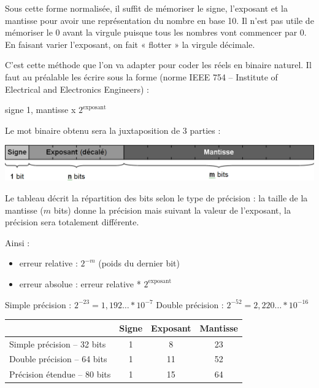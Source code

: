 \documentclass[10pt,fleqn]{article} %
\begin{document}
Sous cette forme normalisée, il suffit de mémoriser le signe, l’exposant et la mantisse pour avoir une représentation du nombre en base 10. Il n’est pas utile de mémoriser le 0 avant la virgule puisque tous les nombres vont commencer par 0. En faisant varier l’exposant, on fait « flotter » la virgule décimale.

C’est cette méthode que l’on va adapter pour coder les réels en binaire naturel. Il faut au préalable les écrire sous la forme (norme IEEE 754 – Institute of Electrical and Electronics Engineers) :

\begin{center}
signe 1, mantisse x $2^{\text{exposant}}$
\end{center}

Le mot binaire obtenu sera la juxtaposition de 3 parties :

\begin{center}
\includegraphics[width=.7\textwidth]{images/reel_1}
\end{center}

\begin{minipage}[c]{.4\linewidth}
Le tableau décrit la répartition des bits selon le type de précision : la taille de la mantisse ($m$ bits) donne la précision mais suivant la valeur de l'exposant, la précision sera totalement différente. 

Ainsi : 
\begin{itemize}
\item erreur relative : $2^{-m}$ (poids du dernier bit)
\item erreur absolue : erreur relative * $2^{\text{exposant}}$
\end{itemize}

Simple précision :  	$2^{- 23} = 1,192 … * 10^{- 7}$ 
Double précision :  	$2^{- 52} = 2,220 … * 10^{- 16}$


\end{minipage}\hfill
\begin{minipage}[c]{.59\linewidth}
\begin{center}
\begin{tabular}{| l |c|c|c|}
\hline

& Signe & Exposant & Mantisse \\ \hline
 Simple précision -- 32 bits & 1 & 8 & 23 \\ \hline
 Double précision -- 64 bits & 1 & 11 & 52 \\ \hline
 Précision étendue -- 80 bits & 1 & 15 & 64 \\ \hline
\end{tabular}
\end{center}
\end{minipage}
\end{document}
